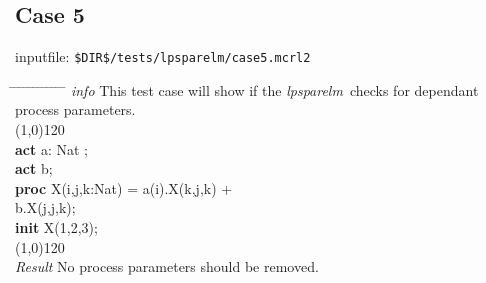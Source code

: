 \documentclass[a4paper,10pt]{article}
\theoremstyle{plain}
\theoremstyle{definition}
\newcommand{\tool}{\textit{lpsparelm}}
\newcommand{\ti}{\textit}
\newcommand{\tb}{\textbf}
\newcommand{\pps}{process parameters}
\newcommand{\tabw}{\hspace*{15.mm} \= \hspace*{20.mm} \= \hspace*{5.mm} \= \hspace*{5.mm} \= \hspace*{5.mm} \= \hspace*{5.mm}  \= \hspace*{5.mm}  \= \hspace*{5.mm}  \= \hspace*{5.mm} \= \hspace*{5.mm} \= \hspace*{5.mm}  \= \hspace*{5.mm}  \= \hspace*{5.mm}\kill}
\begin{document}
\subsection*{Case 5}
inputfile: \verb"$DIR$/tests/lpsparelm/case5.mcrl2"
\begin{tabbing}
\tabw
\ti{info} \> This test case will show if the \tool\ checks for dependant \pps .\\
\line(1,0){120}\\
\tb{act} \> a: Nat ; \\
\tb{act} \> b; \\
\tb{proc} \> X(i,j,k:Nat) = \> a(i).X(k,j,k) + \\
          \> \>              b.X(j,j,k);\\
\tb{init} \> X(1,2,3); \\  
\line(1,0){120}\\
\ti{Result} \> No process parameters should be removed.\\ 
\end{tabbing}
\end{document}
